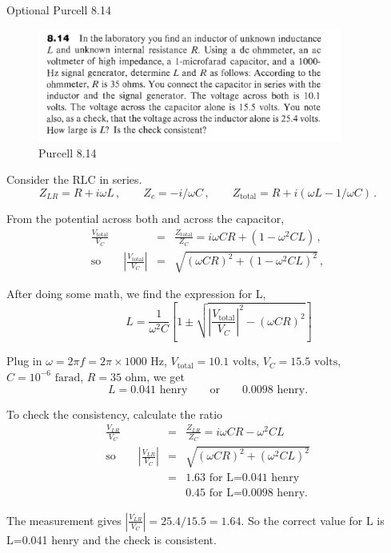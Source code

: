 \documentclass[makesolutionspdf]{esg8022pset}
\begin{document}
\begin{problem}{Optional Purcell 8.14}
\begin{figure}[H]
    \centering
    \includegraphics[width = 10cm]{pu814}
    \caption{Purcell 8.14}
  \end{figure}
  
  
\end{problem}
\begin{solution}
Consider the RLC in series.  
\begin{equation}
Z_{LR}=R+i\omega L\,,\qquad Z_c=-i/\omega C\,,\qquad
Z_{\textrm{total}}=R+i(\omega L-1/\omega C)\,.
\end{equation}

From the potential across both and across the capacitor,
\begin{eqnarray}
\frac{V_{\textrm{total}}}{V_C}&=&\frac{Z_{\textrm{total}}}{Z_C}=i\omega
CR+(1-\omega^2 CL)\,,\\
\textrm{so}\qquad \left| \frac{V_{\textrm{total}}}{V_C}\right| &=&
\sqrt{(\omega CR)^2+(1-\omega^2 CL)^2}\,,
\end{eqnarray}

After doing some math, we find the expression for L,
\begin{equation}
\qquad L = \frac{1}{\omega^2 C}\left[
1\pm \sqrt{\left|\frac{V_{\textrm{total}}}{V_C}\right|^2-(\omega CR)^2}
\right]
\end{equation}

Plug in $\omega=2\pi f=2\pi\times 1000\textrm{ Hz}$,
$V_{\textrm{total}}=10.1\textrm{ volts}$, $V_C=15.5\textrm{ volts}$,
$C=10^{-6}\textrm{ farad}$, $R=35\textrm{ ohm}$, we get 
\[ L= 0.041 \textrm{ henry}\qquad\textrm{or}\qquad 0.0098\textrm{ henry}.\]

To check the consistency, calculate the ratio
\begin{eqnarray}
\frac{V_{LR}}{V_C}&=&\frac{Z_{LR}}{Z_C}=i\omega CR-\omega^2 CL\\
\textrm{so}\qquad \left|\frac{V_{LR}}{V_C}\right| &=& \sqrt{(\omega
CR)^2+(\omega^2 CL)^2}\\
&=& 1.63 \textrm{ for L=0.041 henry}\nonumber\\
& & 0.45\textrm{ for L=0.0098 henry}.
\end{eqnarray}

The measurement gives $\left|\frac{V_{LR}}{V_C}\right| =
25.4/15.5=1.64$.  So the correct value for L is L=0.041 henry and the
check is consistent.
\end{solution}
\end{document}
